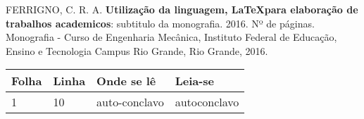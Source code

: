\noindent FERRIGNO, C. R. A. \textbf{Utilização da linguagem, \LaTeX  para elaboração de trabalhos academicos}: subtitulo da monografia. 2016. Nº de páginas. Monografia - Curso de Engenharia Mecânica, Instituto Federal de Educação, Ensino e Tecnologia Campus Rio Grande, Rio Grande, 2016.

\begin{table}[h!]
	\center
	\begin{tabular}{|p{1.4cm}|p{1cm}|p{3cm}|p{3cm}|}
		\hline
		\textbf{Folha} & \textbf{Linha} & \textbf{Onde se lê} &
		\textbf{Leia-se}\\
		\hline
		1 & 10 & auto-conclavo & autoconclavo\\
		\hline
	\end{tabular}
\end{table}
